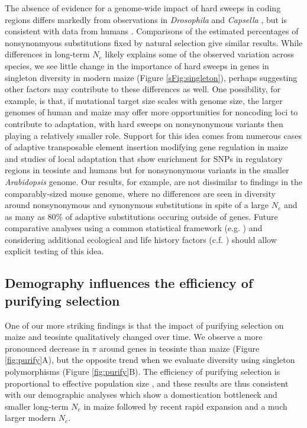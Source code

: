 \documentclass{pnastwo}
\begin{document}
\begin{article}
The absence of evidence for a genome-wide impact of hard sweeps in coding regions differs markedly from observations in \emph{Drosophila} \cite{sattath2011} and \emph{Capsella} \cite{williamson2014}, but is consistent with data from humans \cite{hernandez2011,pritchard2010genetics}.
Comparisons of the estimated percentages of nonsynonmyous substitutions fixed by natural selection \cite{ross2009,sella2009,eyre2009estimating,williamson2014} give similar results. 
While differences in long-term $N_e$ likely explains some of the observed variation across species, we see little change in the importance of hard sweeps in genes in singleton diversity in modern maize (Figure \ref{sFig:singleton}), perhaps suggesting other factors may contribute to these differences as well.  
One possibility, for example, is that, if mutational target size scales with genome size, the larger genomes of human and maize may offer more opportunities for noncoding loci to contribute to adaptation, with hard sweeps on nonsynonymous variants then playing a relatively smaller role. 
Support for this idea comes from numerous cases of adaptive transposable element insertion modifying gene regulation in maize \cite{studer2011,castelletti2014mite,mao2015,yang2013} and studies of local adaptation that show enrichment for SNPs in regulatory regions in teosinte \cite{pyhajarvi2013} and humans \cite{fraser2013gene} but for nonsynonymous variants in the smaller \emph{Arabidopsis} genome.  
Our results, for example, are not dissimilar to findings in the comparably-sized mouse genome, where no differences are seen in diversity around nonsynonymous and synonymous substitutions in spite of a large $N_e$ and  as many as 80\% of adaptive substitutions occuring outside of genes\cite{Halligan:2013ir}.
Future comparative analyses using a common statistical framework (e.g. \cite{corbett2015}) and considering additional ecological and life history factors (c.f. \cite{leffler2012}) should allow explicit testing of this idea.

\subsection{Demography influences the efficiency of purifying selection} %
One of our more striking findings is that the impact of purifying selection on maize and teosinte qualitatively changed over time. 
We observe a more pronounced decrease in $\pi$ around genes in teosinte than maize (Figure \ref{fig:purify}A), but the opposite trend when we evaluate diversity using singleton polymorphisms (Figure \ref{fig:purify}B).
The efficiency of purifying selection is proportional to effective population size \cite{kimura1984}, and these results are thus consistent with our demographic analyses which show a domestication bottleneck and smaller long-term $N_e$ in maize \cite{eyre1998, tenaillon2004, wright2005, ross2009} followed by recent rapid expansion and a much larger modern $N_e$.  


\end{article}
\end{document}
